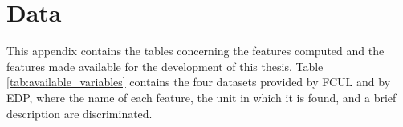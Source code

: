 \chapter{Data}
\label{chapter:appendixE}


This appendix contains the tables concerning the features computed and the features made available for the development of this thesis. Table \ref{tab:available_variables} contains the four datasets provided by \ac{FCUL} and by \ac{EDP}, where the name of each feature, the unit in which it is found, and a brief description are discriminated. 

\newpage

